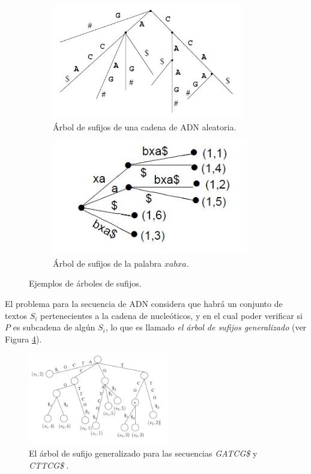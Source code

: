 \begin{figure}[h]

\begin{subfigure}{0.5\textwidth}
\includegraphics[width=0.9\linewidth, height=5cm]{./images/suffixtree1.JPG} 
\caption{Árbol de sufijos de una cadena de ADN aleatoria.}
\label{fig:subim5}
\end{subfigure}
\begin{subfigure}{0.5\textwidth}
\includegraphics[width=0.9\linewidth, height=5cm]{./images/suffixtree2.JPG}
\caption{Árbol de sufijos de la palabra $xabxa$.}
\label{fig:subim6}
\end{subfigure}
 
\caption{Ejemplos de árboles de sufijos.}
\label{fig:image3}
\end{figure}

El problema para la secuencia de ADN considera que habrá un conjunto de textos $S_{i}$ pertenecientes a la cadena de nucleóticos, y en el cual poder verificar si $P$ es subcadena de algún $S_{i}$, lo que es llamado {\it{el árbol de sufijos generalizado}} (ver Figura \ref{fig:mesh1}). 

\begin{figure}[h]
    \centering
    \includegraphics[width=0.55\textwidth]{./images/suffixtree3.JPG}
    \caption{El árbol de sufijo generalizado para las secuencias {\it{GATCG\$}} y {\it{CTTCG\$}} \cite{koaluru}.}
    \label{fig:mesh1}
\end{figure}

